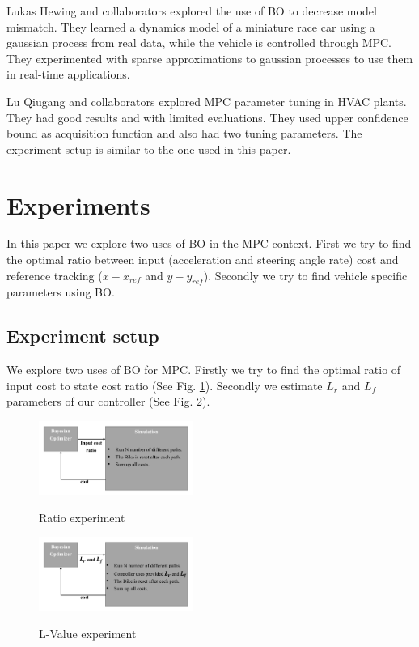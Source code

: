 \documentclass[twoside,twocolumn]{article}
\begin{document}
Lukas Hewing and collaborators \cite{hewing2018cautious} explored the use of BO to decrease model mismatch. They learned a dynamics model of a miniature race car using a gaussian process from real data, while the vehicle is controlled through MPC. They experimented with sparse approximations to gaussian processes to use them in real-time applications.

Lu Qiugang and collaborators \cite{lu2020mpc} explored MPC parameter tuning in HVAC plants. They had good results and with limited evaluations. They used upper confidence bound as acquisition function and also had two tuning parameters. The experiment setup is similar to the one used in this paper.


\section{Experiments}

In this paper we explore two uses of BO in the MPC context. First we try to find the optimal ratio between input (acceleration and steering angle rate) cost and reference tracking ($x - x_{ref}$ and $y - y_{ref}$). Secondly we try to find vehicle specific parameters using BO.

\subsection{Experiment setup}

We explore two uses of BO for MPC. Firstly we try to find the optimal ratio of input cost to state cost ratio (See Fig. \ref{fig:ratio_experiment}). Secondly we estimate $L_r$ and $L_f$ parameters of our controller (See Fig. \ref{fig:l_value_experiment}).

\begin{figure}[h]
    \caption{Ratio experiment}
    \centering
    \includegraphics[width=0.45\textwidth]{fig_ratio_experiment.pdf}
    \label{fig:ratio_experiment}
\end{figure}

\begin{figure}[h]
    \caption{L-Value experiment}
    \centering
    \includegraphics[width=0.45\textwidth]{fig_l_value_experiment.pdf}
    \label{fig:l_value_experiment}
\end{figure}
\end{document}
